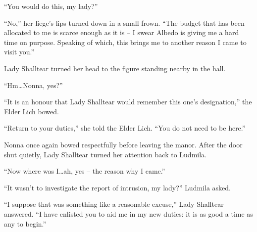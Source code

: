  

“You would do this, my lady?”

 

“No,” her liege’s lips turned down in a small frown. “The budget that has been allocated to me is scarce enough as it is – I swear Albedo is giving me a hard time on purpose. Speaking of which, this brings me to another reason I came to visit you.”

 

Lady Shalltear turned her head to the figure standing nearby in the hall.

 

“Hm…Nonna, yes?”

 

“It is an honour that Lady Shalltear would remember this one’s designation,” the Elder Lich bowed.

 

“Return to your duties,” she told the Elder Lich. “You do not need to be here.”

 

Nonna once again bowed respectfully before leaving the manor. After the door shut quietly, Lady Shalltear turned her attention back to Ludmila.

 

“Now where was I…ah, yes – the reason why I came.”

 

“It wasn’t to investigate the report of intrusion, my lady?” Ludmila asked.

 

“I suppose that was something like a reasonable excuse,” Lady Shalltear answered. “I have enlisted you to aid me in my new duties: it is as good a time as any to begin.”